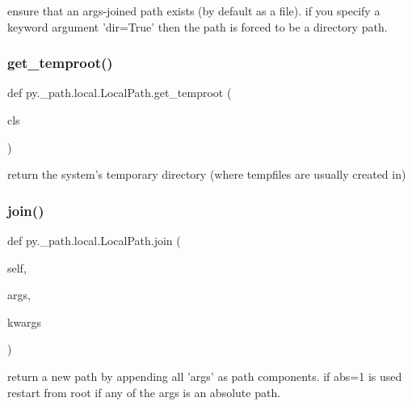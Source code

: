 \begin{DoxyVerb}ensure that an args-joined path exists (by default as
    a file). if you specify a keyword argument 'dir=True'
    then the path is forced to be a directory path.
\end{DoxyVerb}
 \mbox{\label{classpy_1_1__path_1_1local_1_1_local_path_a1f84a58257ba76b82c73f389b83aad75}} 
\subsubsection{\texorpdfstring{get\+\_\+temproot()}{get\_temproot()}}
{\footnotesize\ttfamily def py.\+\_\+path.\+local.\+Local\+Path.\+get\+\_\+temproot (\begin{DoxyParamCaption}\item[{}]{cls }\end{DoxyParamCaption})}

\begin{DoxyVerb}return the system's temporary directory
    (where tempfiles are usually created in)
\end{DoxyVerb}
 \mbox{\label{classpy_1_1__path_1_1local_1_1_local_path_ae4a7d13c55fd2f52e77f8856dd508b2d}} 
\subsubsection{\texorpdfstring{join()}{join()}}
{\footnotesize\ttfamily def py.\+\_\+path.\+local.\+Local\+Path.\+join (\begin{DoxyParamCaption}\item[{}]{self,  }\item[{}]{args,  }\item[{}]{kwargs }\end{DoxyParamCaption})}

\begin{DoxyVerb}return a new path by appending all 'args' as path
components.  if abs=1 is used restart from root if any
of the args is an absolute path.
\end{DoxyVerb}
 \mbox{\label{classpy_1_1__path_1_1local_1_1_local_path_ae0d050dd09cd9347b4da4a60a49520ad}} 
